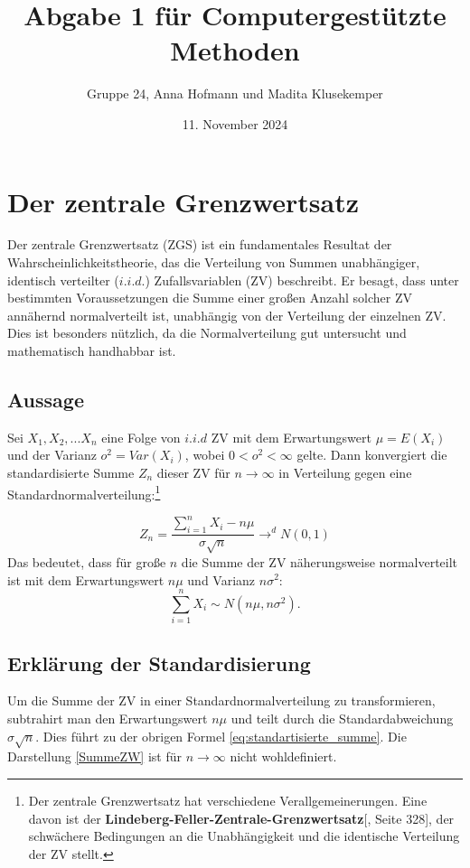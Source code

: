 \documentclass{article}
\title{Abgabe 1 für Computergestützte Methoden}
\author{Gruppe 24, Anna Hofmann und Madita Klusekemper}
\date{11. November 2024}
\begin{document}
\maketitle
\tableofcontents
\newpage
\section{Der zentrale Grenzwertsatz}
Der zentrale Grenzwertsatz (ZGS) ist ein fundamentales Resultat der Wahrscheinlichkeitstheorie, das die Verteilung von Summen unabhängiger, identisch verteilter ($i.i.d.$) Zufallsvariablen (ZV) beschreibt. Er besagt, dass unter bestimmten Voraussetzungen die Summe einer großen Anzahl solcher ZV annähernd normalverteilt ist, unabhängig von der Verteilung der einzelnen ZV. Dies ist besonders nützlich, da die Normalverteilung gut untersucht und mathematisch handhabbar ist.

\subsection{Aussage}
Sei $X_1,X_2,...X_n$ eine Folge von $i.i.d$ ZV mit dem Erwartungswert $\mu=E(X_i)$ und der Varianz $o^2=Var(X_i)$, wobei $0<o^2<\infty$ gelte. Dann konvergiert die standardisierte Summe $Z_n$ dieser ZV für $n\to\infty$ in Verteilung gegen eine Standardnormalverteilung:\footnote{Der zentrale Grenzwertsatz hat verschiedene Verallgemeinerungen. Eine davon ist der \textbf{Lindeberg-Feller-Zentrale-Grenzwertsatz}[\cite{citation-key}, Seite 328], der schwächere Bedingungen an
die Unabhängigkeit und die identische Verteilung der ZV stellt.}

\begin{equation}
  \label{eq:standartisierte_summe}  
   Z_n = \frac{\sum_{i=1}^n X_i - n\mu}{\sigma\sqrt{n} } \to^d N(0,1)
\end{equation}
Das bedeutet, dass für große $n$ die Summe der ZV näherungsweise normalverteilt
ist mit dem Erwartungswert $n\mu$ und Varianz $n\sigma ^2$: 
\begin{equation}
    \label{SummeZW}
    \sum_{i=1}^n X_i \sim N(n\mu,n\sigma^2).
\end{equation}

\subsection{Erklärung der Standardisierung}
Um die Summe der ZV in einer Standardnormalverteilung zu transformieren, subtrahirt man den Erwartungswert $n\mu$ und teilt durch die Standardabweichung $\sigma\sqrt{n}$. Dies führt zu der obrigen Formel \eqref{eq:standartisierte_summe}. Die Darstellung \eqref{SummeZW} ist für $n\to\infty$ nicht wohldefiniert. 
\end{document}
